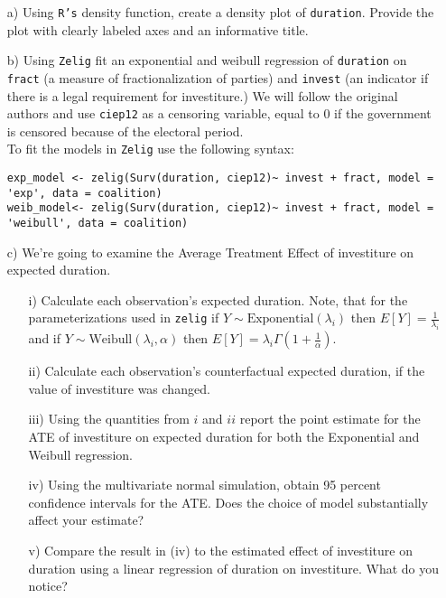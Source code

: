 \documentclass[letterpaper,12pt]{article}
\numberwithin{equation}{section}
\numberwithin{equation}{section}
\begin{document}
\begin{itemize}
\item[a)] Using {\tt R's} density function, create a density plot of {\tt duration}.  Provide the plot with clearly labeled axes and an informative title.
\item[b)] Using {\tt Zelig} fit an exponential and weibull regression of {\tt duration} on {\tt fract} (a measure of fractionalization of parties) and {\tt invest} (an indicator if there is a legal requirement for investiture.)  We will follow the original authors and use {\tt ciep12} as a censoring variable, equal to 0 if the government is censored because of the electoral period.  \\

To fit the models in {\tt Zelig} use the following syntax:

\begin{footnotesize}
\begin{verbatim}
exp_model <- zelig(Surv(duration, ciep12)~ invest + fract, model = 'exp', data = coalition)
weib_model<- zelig(Surv(duration, ciep12)~ invest + fract, model = 'weibull', data = coalition)
\end{verbatim}
\end{footnotesize}

\item[c)] We're going to examine the Average Treatment Effect of investiture on expected duration.
\begin{itemize}
\item[i)] Calculate each observation's expected duration.  Note, that for the parameterizations used in {\tt zelig} if $Y\sim \text{Exponential}(\lambda_{i})$ then $E[Y] = \frac{1}{\lambda_{i}}$ and if $Y \sim \text{Weibull}(\lambda_{i}, \alpha)$ then $E[Y]  = \lambda_{i} \Gamma( 1 + \frac{1}{\alpha})$.
\item[ii)] Calculate each observation's counterfactual expected duration, if the value of investiture was changed.
\item[iii)] Using the quantities from $i$ and $ii$ report the point estimate for the ATE of investiture on expected duration for both the Exponential and Weibull regression.
\item[iv)] Using the multivariate normal simulation, obtain 95 percent confidence intervals for the ATE.  Does the choice of model substantially affect your estimate?
\item[v)] Compare the result in (iv) to the estimated effect of investiture on duration using a linear regression of duration on investiture.  What do you notice?
\end{itemize}
\end{itemize}
\end{document}
